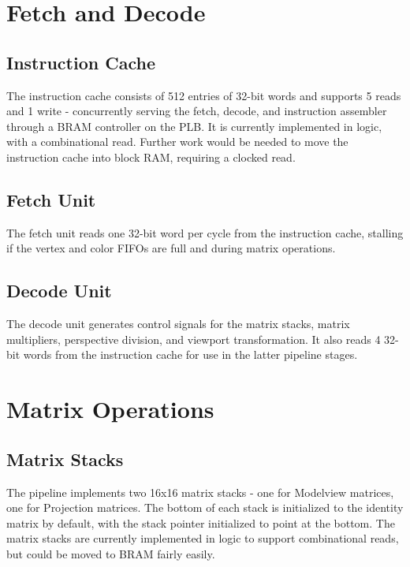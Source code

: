\documentclass[letterpaper,10pt]{article}
\begin{document}
\section{Fetch and Decode}
\subsection{Instruction Cache}
The instruction cache consists of 512 entries of 32-bit words and supports 5 reads and 1 write - concurrently serving the fetch, decode, and instruction assembler through a BRAM controller on the PLB. It is currently implemented in logic, with a combinational read. Further work would be needed to move the instruction cache into block RAM, requiring a clocked read.

\subsection{Fetch Unit}
The fetch unit reads one 32-bit word per cycle from the instruction cache, stalling if the vertex and color FIFOs are full and during matrix operations.

\subsection{Decode Unit}
The decode unit generates control signals for the matrix stacks, matrix multipliers, perspective division, and viewport transformation. It also reads 4 32-bit words from the instruction cache for use in the latter pipeline stages.

\section{Matrix Operations}

\subsection{Matrix Stacks}
The pipeline implements two 16x16 matrix stacks - one for Modelview matrices, one for Projection matrices. The bottom of each stack is initialized to the identity matrix by default, with the stack pointer initialized to point at the bottom. The matrix stacks are currently implemented in logic to support combinational reads, but could be moved to BRAM fairly easily. 
\end{document}
